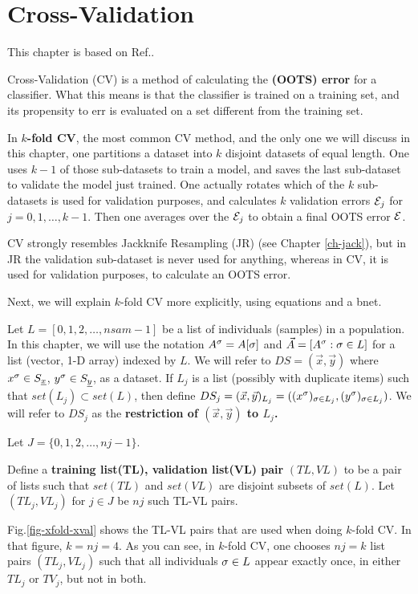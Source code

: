 \chapter{Cross-Validation}
\label{ch-cross-val}

This chapter is based on Ref.\cite{wiki-xval}.

Cross-Validation (CV)
is a method 
of calculating the 
{\bf {} (OOTS) error}
for a classifier.
What this means is that the classifier 
is trained on a training set,
and its propensity to err is evaluated
on a set different from the training set.

In {\bf $k$-fold CV}, the most common CV method, 
and the only one we will discuss in this chapter,
one
partitions a  
dataset into $k$ disjoint datasets
of equal length.
One uses $k-1$ of those
sub-datasets to train a model,
and saves the last sub-dataset to
validate the model just trained.
One actually rotates which of 
the $k$ sub-datasets is used 
for validation purposes,
and calculates $k$ validation 
errors ${\cal E}_j$ for $j=0, 1, \ldots, k-1$.
Then one averages over the ${\cal E}_j$
to obtain a final OOTS error ${\cal E}$. 

CV strongly resembles
Jackknife
Resampling (JR) 
(see Chapter \ref{ch-jack}),
but in JR 
the validation sub-dataset is
never used for anything,
whereas in CV,
it is used for validation
purposes, to calculate
an OOTS error.

Next, we will
explain $k$-fold CV more explicitly,
using 
equations and a bnet.


Let $L=[0,1,2, \ldots, nsam-1]$ be a list of
individuals (samples) in a population.
In this chapter, we will use the notation 
$A^\sigma=A[\sigma]$ 
and $\vec{A}=[A^\sigma:\sigma\in L]$
for a  list (vector, 1-D  array) indexed by $L$.
We will refer to $DS=(\vec{x}, \vec{y})$ 
where $x^\s\in S_\rvx$, $y^\s\in S_\rvy$,
as a dataset.
If
$L_j$ is a list (possibly with 
duplicate items)
such that $set(L_j)\subset set(L)$, then
define
$DS_j=(\vec{x}, \vec{y})_{L_j}=
((x^\sigma)_{\sigma\in L_j}, 
(y^\sigma)_{\sigma\in L_j})$.
We will
refer to $DS_j$
as the {\bf restriction of 
$(\vec{x}, \vec{y})$ to $L_j$.}

Let
$J=\{0,1, 2, \ldots, nj-1\}$.

Define a {\bf training list(TL),
validation list(VL) pair} $(TL,VL)$
to be a pair of lists
such that 
$set(TL)$ and $set(VL)$
are disjoint subsets
of $set(L)$.
Let $(TL_j, VL_j)$ for $j\in J$
be $nj$ such TL-VL pairs.


Fig.\ref{fig-xfold-xval} 
shows
the TL-VL pairs 
that are used
when doing $k$-fold 
CV.
In that figure, $k=nj=4$.
As you can see,
in $k$-fold CV, one chooses 
$nj=k$ list pairs $(TL_j, VL_j)$
such that all individuals $\sigma\in L$
appear exactly once, in either
$TL_j$ or $TV_j$, but not in both.

